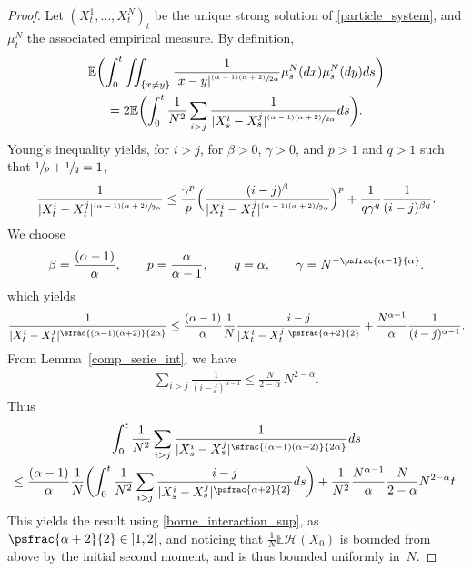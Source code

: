 \begin{proof}
Let $(X^1_t,\dots,X^N_t)_t$ be the unique strong solution of \eqref{particle_system}, and $\mu^N_t$ the associated empirical measure. By definition,
\begin{multline*}
\mathbb{E}\biggl(\int_{0}^t\iint_{\{x\neq y\}}\frac{1}{|x-y|^{\sfrac{(\alpha-1)(\alpha+2)}{2\alpha}}}\mu^N_s(dx)\mu^N_s(dy)ds\biggr)\\
=2\mathbb{E}\biggl(\int_{0}^t\frac{1}{N^2}\sum_{i> j}\frac{1}{|X^i_s-X^j_s|^{\sfrac{(\alpha-1)(\alpha+2)}{2\alpha}}}ds\biggr).
\end{multline*}
Young's inequality yields, for $i>j$, for $\beta>0$, $\gamma>0$, and $p>1$ and $q>1$ such that $\sfrac{1}{p}+\sfrac{1}{q}=1$,
\begin{align*}
\frac{1}{|X^i_t-X^j_t|^{\sfrac{(\alpha-1)(\alpha+2)}{2\alpha}}}\leq \frac{\gamma^p}{p}\Bigl(\frac{(i-j)^\beta}{|X^i_t-X^j_t|^{\sfrac{(\alpha-1)(\alpha+2)}{2\alpha}}}\Bigr)^p+\frac{1}{q\gamma^q}\frac{1}{(i-j)^{\beta q}}.
\end{align*}
We choose
\begin{align*}
\beta=\frac{(\alpha-1)}{\alpha},\qquad p=\frac{\alpha}{\alpha-1},\qquad q=\alpha,\qquad \gamma=N^{-\psfrac{\alpha-1}{\alpha}}.
\end{align*}
which yields
\begin{align*}
\frac{1}{|X^i_t-X^j_t|^{\sfrac{(\alpha-1)(\alpha+2)}{2\alpha}}}\leq\frac{(\alpha-1)}{\alpha}\frac{1}{N}\frac{i-j}{|X^i_t-X^j_t|^{\psfrac{\alpha+2}{2}}}+\frac{N^{\alpha-1}}{\alpha}\frac{1}{(i-j)^{\alpha-1}}.
\end{align*}
From Lemma~\ref{comp_serie_int}, we have
\begin{align*}
\sum_{i>j}\frac{1}{(i-j)^{\alpha-1}}\leq\frac{N}{2-\alpha}\,N^{2-\alpha}.
\end{align*}
Thus
\begin{multline*}
\int_0^t\frac{1}{N^2}\sum_{i>j}\frac{1}{|X^i_s-X^j_s|^{\sfrac{(\alpha-1)(\alpha+2)}{2\alpha}}}ds\\
\leq \frac{(\alpha-1)}{\alpha}\frac{1}{N}\biggl(\int_0^t\frac{1}{N^2}\sum_{i>j}\frac{i-j}{|X^i_s-X^j_s|^{\psfrac{\alpha+2}{2}}}ds\biggr)
+\frac{1}{N^2}\frac{N^{\alpha-1}}{\alpha}\frac{N}{2-\alpha}N^{2-\alpha}t.
\end{multline*}
This yields the result using \eqref{borne_interaction_sup}, as $\psfrac{\alpha+2}{2}\in{}]1,2[$, and noticing that $\frac{1}{N}\mathbb{E}\mathcal{H}(X_0)$ is bounded from above by the initial second moment, and is thus bounded uniformly in~$N$.
\end{proof}


